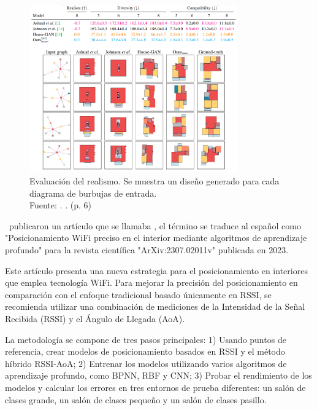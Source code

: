 \begin{figure}[!ht]
	\begin{center}
		\includegraphics[width=0.8\textwidth]{2/figures/nauata2021_2.png}
		\caption[Evaluación del realismo. Se muestra un diseño generado para cada diagrama de burbujas de entrada]{Evaluación del realismo. Se muestra un diseño generado para cada diagrama de burbujas de entrada.\\
			Fuente: \cite{pr_nauata2021housegan}. . (p. 6)}
		\label{2:fig116}
	\end{center}
\end{figure}


\cite{pr_cai2023precisewifi} publicaron un artículo que se llamaba , el término se traduce al español como "Posicionamiento WiFi preciso en el interior mediante algoritmos de aprendizaje profundo" para la revista científica "ArXiv:2307.02011v" publicada en 2023.

Este artículo presenta una nueva estrategia para el posicionamiento en interiores que emplea tecnología WiFi. Para mejorar la precisión del posicionamiento en comparación con el enfoque tradicional basado únicamente en RSSI, se recomienda utilizar una combinación de mediciones de la Intensidad de la Señal Recibida (RSSI) y el Ángulo de Llegada (AoA).

La metodología se compone de tres pasos principales: 1) Usando puntos de referencia, crear modelos de posicionamiento basados en RSSI y el método híbrido RSSI-AoA; 2) Entrenar los modelos utilizando varios algoritmos de aprendizaje profundo, como BPNN, RBF y CNN; 3) Probar el rendimiento de los modelos y calcular los errores en tres entornos de prueba diferentes: un salón de clases grande, un salón de clases pequeño y un salón de clases pasillo.

